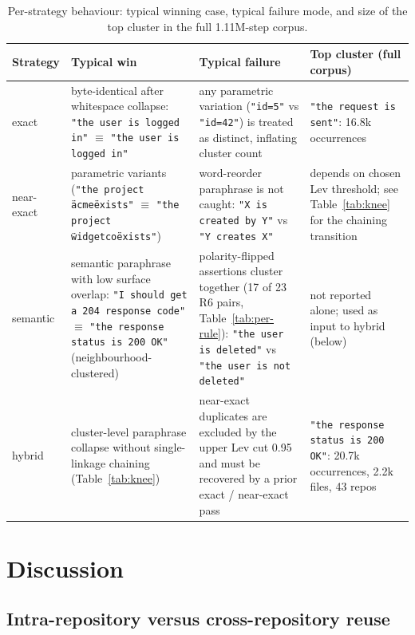 \documentclass[11pt,a4paper]{article}
\begin{document}
\begin{table}[h]
\centering
\caption{Per-strategy behaviour: typical winning case, typical
failure mode, and size of the top cluster in the full 1.11M-step
corpus.}
\label{tab:strategy-cases}
\footnotesize
\setlength{\tabcolsep}{3.5pt}
\begin{tabular}{p{2.1cm}p{4.3cm}p{4.3cm}p{3.0cm}}
\toprule
Strategy & Typical win & Typical failure & Top cluster (full corpus) \\
\midrule
exact       &
  byte-identical after whitespace collapse: \texttt{"the user is logged in"} $\equiv$ \texttt{"the user is logged in"} &
  any parametric variation (\texttt{"id=5"} vs \texttt{"id=42"}) is treated as distinct, inflating cluster count &
  \texttt{"the request is sent"}: 16.8k occurrences \\
near-exact  &
  parametric variants (\texttt{"the project \"acme\" exists"} $\equiv$ \texttt{"the project \"widgetco\" exists"}) &
  word-reorder paraphrase is not caught: \texttt{"X is created by Y"} vs \texttt{"Y creates X"} &
  depends on chosen Lev threshold; see Table~\ref{tab:knee} for the chaining transition \\
semantic    &
  semantic paraphrase with low surface overlap: \texttt{"I should get a 204 response code"} $\equiv$ \texttt{"the response status is 200 OK"} (neighbourhood-clustered) &
  polarity-flipped assertions cluster together (17 of 23 R6 pairs, Table~\ref{tab:per-rule}): \texttt{"the user is deleted"} vs \texttt{"the user is not deleted"} &
  not reported alone; used as input to hybrid (below) \\
hybrid      &
  cluster-level paraphrase collapse without single-linkage chaining (Table~\ref{tab:knee}) &
  near-exact duplicates are excluded by the upper Lev cut 0.95 and must be recovered by a prior exact / near-exact pass &
  \texttt{"the response status is 200 OK"}: 20.7k occurrences, 2.2k files, 43 repos \\
\bottomrule
\end{tabular}
\end{table}

\section{Discussion}
\label{sec:discussion}

\subsection{Intra-repository versus cross-repository reuse}
\end{document}
